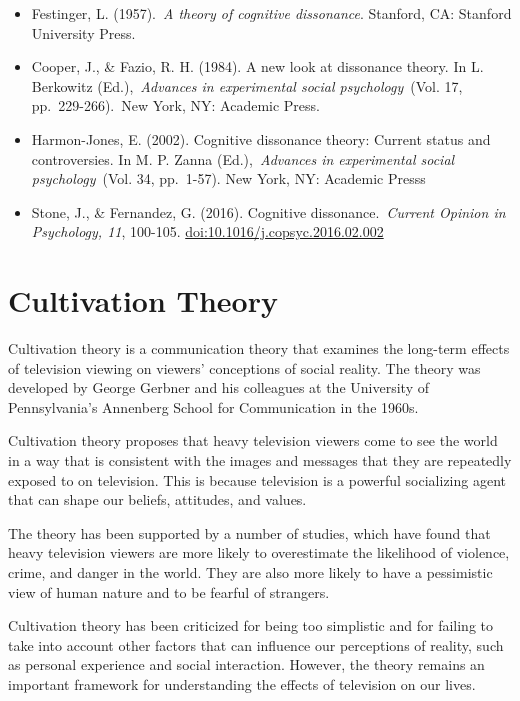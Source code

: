 \documentclass[
  b5paper]{book}
\begin{document}
\begin{itemize}
\item
  Festinger, L. (1957).~\emph{A theory of cognitive dissonance}. Stanford, CA: Stanford University Press.
\item
  Cooper, J., \& Fazio, R. H. (1984). A new look at dissonance theory. In L. Berkowitz (Ed.),~\emph{Advances in experimental social psychology}~(Vol. 17, pp.~229-266).~New York, NY: Academic Press.
\item
  Harmon-Jones, E. (2002). Cognitive dissonance theory: Current status and controversies. In M. P. Zanna (Ed.),~\emph{Advances in experimental social psychology}~(Vol. 34, pp.~1-57). New York, NY: Academic Presss
\item
  Stone, J., \& Fernandez, G. (2016). Cognitive dissonance.~\emph{Current Opinion in Psychology, 11}, 100-105. \url{doi:10.1016/j.copsyc.2016.02.002}
\end{itemize}

\hypertarget{cultivation-theory}{%
\section{Cultivation Theory}\label{cultivation-theory}}

Cultivation theory is a communication theory that examines the long-term effects of television viewing on viewers' conceptions of social reality. The theory was developed by George Gerbner and his colleagues at the University of Pennsylvania's Annenberg School for Communication in the 1960s.

Cultivation theory proposes that heavy television viewers come to see the world in a way that is consistent with the images and messages that they are repeatedly exposed to on television. This is because television is a powerful socializing agent that can shape our beliefs, attitudes, and values.

The theory has been supported by a number of studies, which have found that heavy television viewers are more likely to overestimate the likelihood of violence, crime, and danger in the world. They are also more likely to have a pessimistic view of human nature and to be fearful of strangers.

Cultivation theory has been criticized for being too simplistic and for failing to take into account other factors that can influence our perceptions of reality, such as personal experience and social interaction. However, the theory remains an important framework for understanding the effects of television on our lives.
\end{document}
